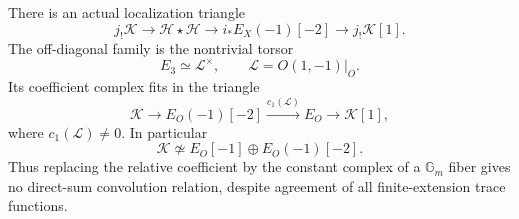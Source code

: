 \begin{finding}
\label{f:nonpropertorus}
There is an actual localization triangle
\begin{equation}\label{eq:flagopenclosedrelation}
 j_!\mathcal K\longrightarrow
 \mathcal H\star\mathcal H\longrightarrow
 i_*E_X(-1)[-2]\longrightarrow j_!\mathcal K[1].
\end{equation}
The off-diagonal family is the nontrivial torsor
\[
 E_3\simeq\mathcal L^\times,\qquad
                  \mathcal L=O(1,-1)|_O.
\]
Its coefficient complex fits in the triangle
\begin{equation}\label{eq:torusCherntriangle}
 \mathcal K\longrightarrow E_O(-1)[-2]
   \xrightarrow{c_1(\mathcal L)} E_O
   \longrightarrow\mathcal K[1],
\end{equation}
where \(c_1(\mathcal L)\ne0\).
In particular
\[
 \mathcal K\not\simeq E_O[-1]\oplus E_O(-1)[-2].
\]
Thus replacing the relative coefficient by the constant
complex of a \(\mathbb G_m\) fiber gives no direct-sum
convolution relation, despite agreement of all finite-extension
trace functions.
\end{finding}

